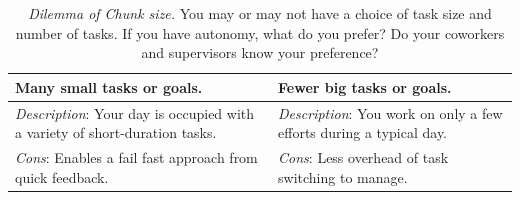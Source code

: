 
\begin{center}
\begin{table}[H] %
\begin{tabular}{ | m{\dilemmatablewidth}| m{\dilemmatablewidth} | } 
  \hline
  \textbf{Many small tasks or goals.} & 
  \textbf{Fewer big tasks or goals.} \\ 
  \hline
  \textit{Description}: Your day is occupied with a variety of short-duration tasks. & 
  \textit{Description}: You work on only a few efforts during a typical day. \\  
    \hline
  \textit{Cons}: Enables a fail fast approach from quick feedback. & 
  \textit{Cons}: Less overhead of task switching to manage. \\
  \hline
\end{tabular}
\caption{
\textit{Dilemma of Chunk size.}
You may or may not have a choice of task size and number of tasks. If you have autonomy, what do you prefer? Do your coworkers and supervisors know your preference? 
}
\label{table:dilemma-chunk-size}
\end{table}
\end{center}




